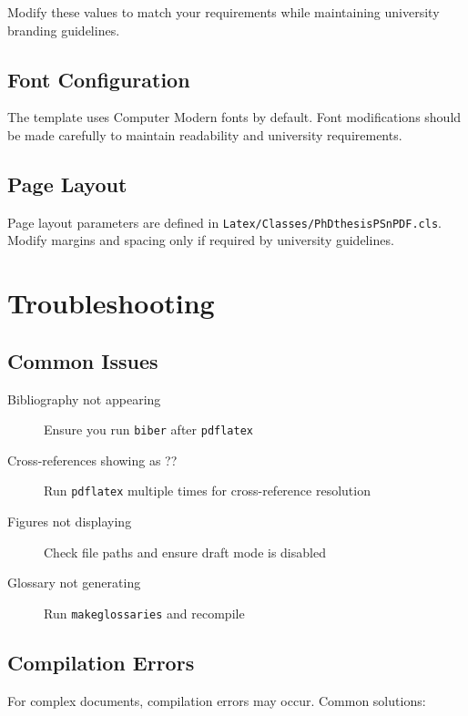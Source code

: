 Modify these values to match your requirements while maintaining university branding guidelines.

\subsection{Font Configuration}
\label{sect:font-config}

The template uses Computer Modern fonts by default. Font modifications should be made carefully to maintain readability and university requirements.

\subsection{Page Layout}
\label{sect:page-layout}

Page layout parameters are defined in \texttt{Latex/Classes/PhDthesisPSnPDF.cls}. Modify margins and spacing only if required by university guidelines.

\section{Troubleshooting}
\label{sect:troubleshooting}

\subsection{Common Issues}
\label{sect:common-issues}

\begin{description}
    \item[Bibliography not appearing] Ensure you run \texttt{biber} after \texttt{pdflatex}
    \item[Cross-references showing as ??] Run \texttt{pdflatex} multiple times for cross-reference resolution
    \item[Figures not displaying] Check file paths and ensure draft mode is disabled
    \item[Glossary not generating] Run \texttt{makeglossaries} and recompile
\end{description}

\subsection{Compilation Errors}
\label{sect:compilation-errors}

For complex documents, compilation errors may occur. Common solutions:

